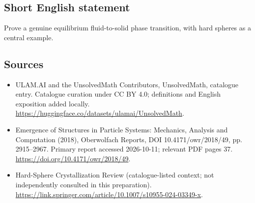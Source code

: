 \documentclass[11pt]{article}
\begin{document}
\subsection{Short English statement}
Prove a genuine equilibrium fluid-to-solid phase transition, with hard spheres as a central example.
\subsection{Sources}
\begin{itemize}
\item[\hypertarget{source:statement:1}{S1}] ULAM.AI and the UnsolvedMath Contributors, UnsolvedMath, catalogue entry. Catalogue curation under CC BY 4.0; definitions and English exposition added locally.
\url{https://huggingface.co/datasets/ulamai/UnsolvedMath}.
\item[\hypertarget{source:statement:2}{S2}] Emergence of Structures in Particle Systems: Mechanics, Analysis and Computation (2018), Oberwolfach Reports, DOI 10.4171/owr/2018/49, pp. 2915--2967. Primary report accessed 2026-10-11; relevant PDF pages 37.
\url{https://doi.org/10.4171/owr/2018/49}.
\item[\hypertarget{source:statement:3}{S3}] Hard-Sphere Crystallization Review (catalogue-listed context; not independently consulted in this preparation).
\url{https://link.springer.com/article/10.1007/s10955-024-03349-x}.
\end{itemize}
\label{end:statement}
\end{document}
